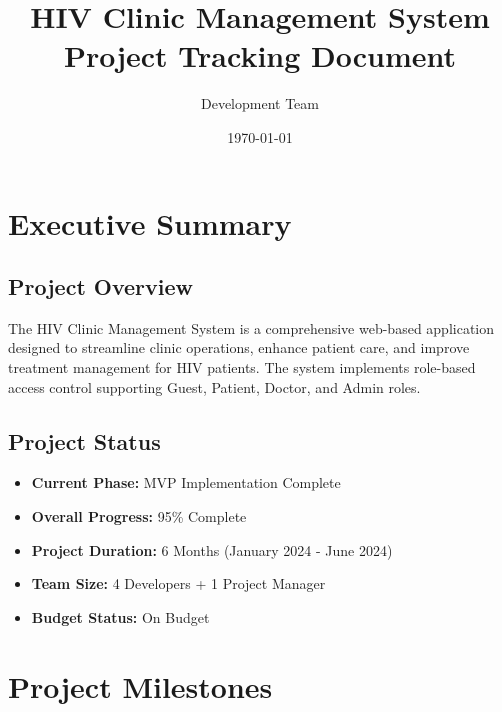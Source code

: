 \documentclass[12pt,a4paper]{article}
\title{\textbf{HIV Clinic Management System \\
Project Tracking Document}}
\author{Development Team}
\date{\today}
\begin{document}
\maketitle

\tableofcontents
\newpage

\section{Executive Summary}

\subsection{Project Overview}
The HIV Clinic Management System is a comprehensive web-based application designed to streamline clinic operations, enhance patient care, and improve treatment management for HIV patients. The system implements role-based access control supporting Guest, Patient, Doctor, and Admin roles.

\subsection{Project Status}
\begin{itemize}
    \item \textbf{Current Phase:} MVP Implementation Complete
    \item \textbf{Overall Progress:} 95\% Complete
    \item \textbf{Project Duration:} 6 Months (January 2024 - June 2024)
    \item \textbf{Team Size:} 4 Developers + 1 Project Manager
    \item \textbf{Budget Status:} On Budget
\end{itemize}

\section{Project Milestones}
\end{document}

